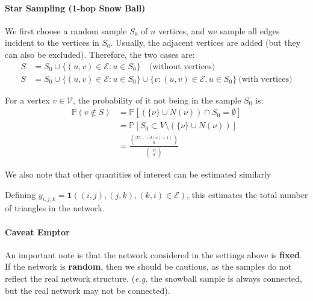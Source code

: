 \documentclass{article}
\begin{document}
\paragraph{Star Sampling (1-hop Snow Ball)} We first choose a random sample $S_0$ of $n$ vertices, and we sample all edges incident to the vertices in $S_0$. Usually, the adjacent vertices are added (but they can also be excluded). Therefore, the two cases are:
\begin{align*}
    S &= S_0\cup \{(u,v)\in \mathcal{E}: u\in S_0\}\quad \text{(without vertices)}\\
    S &= S_0\cup \{(u,v)\in \mathcal{E}: u\in S_0\} \cup \{v: (u,v)\in \mathcal{E}, u\in S_0\} \ \text{(with vertices)}
\end{align*}
\begin{example}
    For a vertex $v\in \mathcal{V}$, the probability of it not being in the sample $S_0$ is:
    \begin{align*}
        \mathbb{P}(v\notin S) &= \mathbb{P}[\left(\{\nu\}\cup N(\nu)\right)\cap S_{0}=\emptyset]\\
        &= \mathbb{P}[S_{0}\subset V\setminus(\{\nu\}\cup N(\nu))]\\
        &= \frac{\binom{|\mathcal{V}|-(d(\nu)+1)}{n}}{\binom{|\mathcal{V}|}{n}}
    \end{align*}
\end{example}

We also note that other quantities of interest can be estimated similarly \begin{example}[Triangles]
    Defining $y_{i,j,k}=\mathbf{1}((i,j),(j,k),(k,i)\in \mathcal{E})$, this estimates the total number of triangles in the network.
\end{example}

\paragraph{Caveat Emptor} An important note is that the network considered in the settings above is \textbf{fixed}. If the network is \textbf{random}, then we should be cautious, as the samples do not reflect the real network structure. (\textit{e.g.} the snowball sample is always connected, but the real network may not be connected).  
\end{document}
